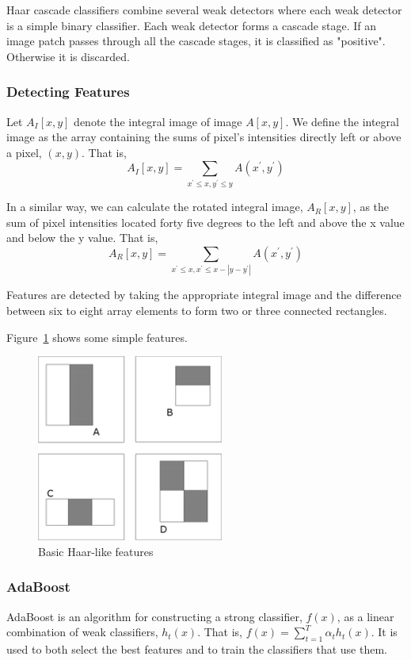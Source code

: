 \documentclass{article}
\begin{document}
Haar cascade classifiers combine several weak detectors where each weak detector is a simple binary classifier. Each weak detector forms a cascade stage.
If an image patch passes through all the cascade stages, it is classified as "positive". Otherwise it is discarded.

\subsubsection{Detecting Features}
Let $A_I[x,y]$ denote the integral image of image $A[x,y]$. We define the integral image as the array containing the sums of pixel's intensities directly left or above a pixel, $(x, y)$. That is,
\begin{equation}
	A_I[x,y] = \sum_{x^\prime\le x, y^\prime\le y}A(x^\prime, y^\prime)
\end{equation}

In a similar way, we can calculate the rotated integral image, $A_R[x,y]$, as the sum of pixel intensities located forty five degrees to the left and above the x value and below the y value. That is,
\begin{equation}
	A_R[x,y] = \sum_{x^\prime\le x, x^\prime\le x-|y-y^\prime|}A(x^\prime, y^\prime)
\end{equation}

Features are detected by taking the appropriate integral image and the difference between six to eight array elements to form two or three connected rectangles.

Figure~\ref{fig:features} shows some simple features.
\begin{figure}[H]
\centering
\includegraphics[width=0.2\linewidth]{./haarfeatures}
\caption{Basic Haar-like features}
\label{fig:features}
\end{figure} %

\subsubsection{AdaBoost}
AdaBoost is an algorithm for constructing a strong classifier, $f(x)$, as a linear combination of weak classifiers, $h_t(x)$. That is, $f(x)=\sum_{t=1}^{T}\alpha_th_t(x)$. It is used to both select the best features and to train the classifiers that use them.
\end{document}
